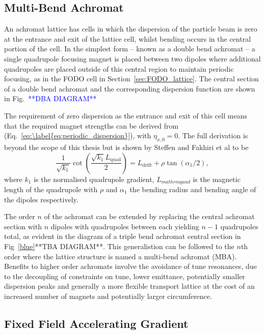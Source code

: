 \documentclass[../main.tex]{subfiles}
\begin{document}
\subsection{Multi-Bend Achromat}

An achromat lattice has cells in which the dispersion of the particle beam is zero at the entrance and exit of the lattice cell, whilst bending occurs in the central portion of the cell. In the simplest form -- known as a double bend achromat -- a single quadrupole focusing magnet is placed between two dipoles where additional quadrupoles are placed outside of this central region to maintain periodic focusing, as in the FODO cell in Section~\ref{sec:FODO_lattice}. The central section of a double bend achromat and the corresponding dispersion function are shown in Fig.~\textcolor{blue}{**DBA DIAGRAM**}

The requirement of zero dispersion as the entrance and exit of this cell means that the required magnet strengths can be derived from (Eq.~\ref{eq:\label{eq:periodic_dispersion}}), with $\eta_{x,0}=0$.
The full derivation is beyond the scope of this thesis but is shown by Steffen \cite{steffen1983periodic} and Fakhiri et al \cite{fakhri2015analytical} to be
\begin{equation}
\frac{1}{\sqrt{k_{1}}}\cot\left(\frac{\sqrt{k_{1}}L_{\mathrm{quad}}}{2}\right) = L_{\mathrm{drift}} + \rho\tan\left(\alpha_{1}/2\right),
\label{eq:DBA_magnets}
\end{equation}
where $k_{1}$ is the normalised quadrupole gradient, $L_{mathrm{quad}}$ is the magnetic length of the quadrupole with $\rho$ and $\alpha_{1}$ the bending radius and bending angle of the dipoles respectively. 

The order $n$ of the achromat can be extended by replacing the central achromat section with $n$ dipoles with quadrupoles between each yielding $n-1$ quadrupoles total, as evident in the diagram of a triple bend achromat central section in Fig~\ref{blue}{**TBA DIAGRAM**}. This generalistion can be followed to the $n$th order where the lattice structure is named a multi-bend achromat (MBA). Benefits to higher order achromats involve the avoidance of tune resonances, due to the decoupling of constraints on tune, lower emittance, potentially smaller dispersion peaks and generally a more flexible transport lattice \cite{jackson1986comparison} at the cost of an increased number of magnets and potentially larger circumference.  

\subsection{Fixed Field Accelerating Gradient}
\end{document}
